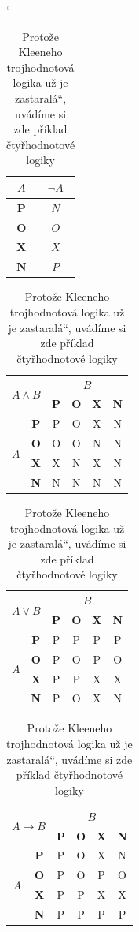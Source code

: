 \documentclass[a4paper, 11pt]{article}
\newcommand{\myuv}[1]{\quotedblbase #1\textquotedblleft}
\begin{document}
\begin{table}[h] 
\begin{center}
\catcode` 
\begin{tabular}{|c|c|} 
\hline
$A$ & $\neg A$\\ \hline
$\textbf{P}$ & $N$\\ \hline
$\textbf{O}$ & $O$\\ \hline
$\textbf{X}$ & $X$\\ \hline
$\textbf{N}$ & $P$\\
\hline
\end{tabular}
\begin{tabular}{|c|c|c|c|c|c|} \hline
\multicolumn{2}{|l|}{\multirow{2}{*}{$A \wedge B$}} & \multicolumn{4}{c|}{$B$}  \\ \cline{3-6} 
\multicolumn{2}{|c|}{} & \textbf{P} & \textbf{O} & \textbf{X} & \textbf{N} \\ \hline
\multirow{4}{*}{$A$} & \textbf{P} & P & O & X & N \\ \cline{2-6} 
 & \textbf{O} & O & O & N & N \\ \cline{2-6}  
 & \textbf{X} & X & N & X & N \\ \cline{2-6} 
 & \textbf{N} & N & N & N & N \\ \hline 
\end{tabular}
\begin{tabular}{|c|c|c|c|c|c|} \hline
\multicolumn{2}{|l|}{\multirow{2}{*}{$A \vee B$}} & \multicolumn{4}{c|}{$B$}  \\ \cline{3-6} 
\multicolumn{2}{|c|}{} & \textbf{P} & \textbf{O} & \textbf{X} & \textbf{N} \\ \hline
\multirow{4}{*}{$A$} & \textbf{P} & P & P & P & P \\ \cline{2-6} 
 & \textbf{O} & P & O & P & O \\ \cline{2-6}  
 & \textbf{X} & P & P & X & X \\ \cline{2-6} 
 & \textbf{N} & P & O & X & N \\ \hline 
\end{tabular}
\begin{tabular}{|c|c|c|c|c|c|} \hline
\multicolumn{2}{|l|}{\multirow{2}{*}{$A \rightarrow B$}} & \multicolumn{4}{c|}{$B$}  \\ \cline{3-6} 
\multicolumn{2}{|c|}{} & \textbf{P} & \textbf{O} & \textbf{X} & \textbf{N} \\ \hline
\multirow{4}{*}{$A$} & \textbf{P} & P & O & X & N \\ \cline{2-6} 
 & \textbf{O} & P & O & P & O \\ \cline{2-6}  
 & \textbf{X} & P & P & X & X \\ \cline{2-6} 
 & \textbf{N} & P & P & P & P \\ \hline 
\end{tabular}
\caption{Protože Kleeneho trojhodnotová logika už je \myuv{zastaralá}, uvádíme si zde příklad čtyřhodnotové
logiky}
\label{logic}
\end{center}
\end{table}
\end{document}
